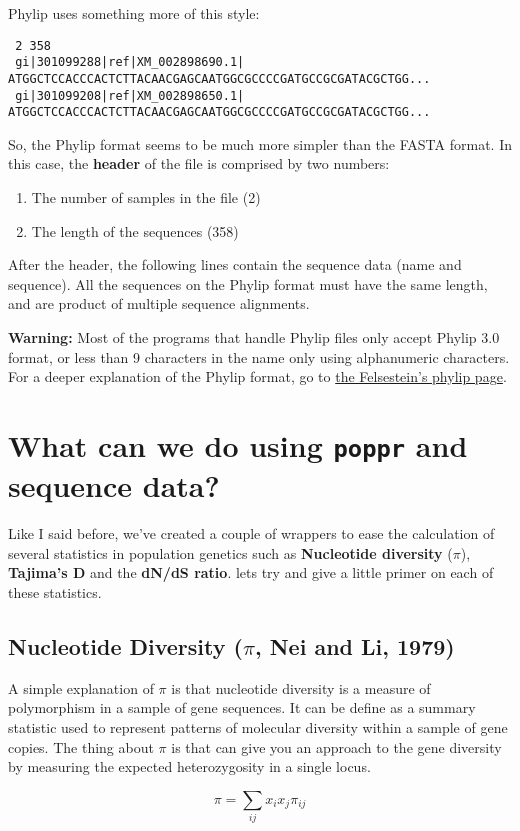 \documentclass[letterpaper]{article}\usepackage[]{graphicx}\usepackage[]{color}
\makeatletter
\newenvironment{kframe}{%
 \def\at@end@of@kframe{}%
 \ifinner\ifhmode%
  \def\at@end@of@kframe{\end{minipage}}%
  \begin{minipage}{\columnwidth}%
 \fi\fi%
 \def\FrameCommand##1{\hskip\@totalleftmargin \hskip-\fboxsep
 \colorbox{shadecolor}{##1}\hskip-\fboxsep
     \hskip-\linewidth \hskip-\@totalleftmargin \hskip\columnwidth}%
 \MakeFramed {\advance\hsize-\width
   \@totalleftmargin\z@ \linewidth\hsize
   \@setminipage}}%
 {\par\unskip\endMakeFramed%
 \at@end@of@kframe}
\newenvironment{knitrout}{}{} %
\makeatother
\begin{document}
Phylip uses something more of this style:
\begin{knitrout}\footnotesize
{}\color{fgcolor}\begin{kframe}
\begin{verbatim}
 2 358
 gi|301099288|ref|XM_002898690.1| ATGGCTCCACCCACTCTTACAACGAGCAATGGCGCCCCGATGCCGCGATACGCTGG...
 gi|301099208|ref|XM_002898650.1| ATGGCTCCACCCACTCTTACAACGAGCAATGGCGCCCCGATGCCGCGATACGCTGG...
\end{verbatim}
\end{kframe}
\end{knitrout}

So, the Phylip format seems to be much more simpler than the FASTA format. In this case, the \textbf{header} of the file is comprised by two numbers:

\begin{enumerate}
  \item The number of samples in the file (2)
  \item The length of the sequences (358)
\end{enumerate}

After the header, the following lines contain the sequence data (name and sequence). All the sequences on the Phylip format must have the same length, and are product of multiple sequence alignments. 

\textbf{Warning:} Most of the programs that handle Phylip files only accept Phylip 3.0 format, or less than 9 characters in the name only using alphanumeric characters. For a deeper explanation of the Phylip format, go to \href{http://evolution.genetics.washington.edu/phylip/doc/sequence.html}{the Felsestein's phylip page}.

\section{What can we do using \texttt{poppr} and sequence data?}
Like I said before, we've created a couple of wrappers to ease the calculation of several statistics in population genetics such as \textbf{Nucleotide diversity} ($\pi$), \textbf{Tajima's D} and the \textbf{dN/dS ratio}. lets try and give a little primer on each of these statistics.

\subsection{Nucleotide Diversity ($\pi$,  Nei and Li, 1979)}
A simple explanation of $\pi$ is that nucleotide diversity is a measure of polymorphism in a sample of gene sequences. It can be define as a summary statistic used to represent patterns of molecular diversity within a sample of gene copies. The thing about $\pi$ is that can give you an approach to the gene diversity by measuring the expected heterozygosity in a single locus.


\begin{equation}
\pi = \sum_{ij} x_i x_j \pi_{ij}
\end{equation}
\end{document}
